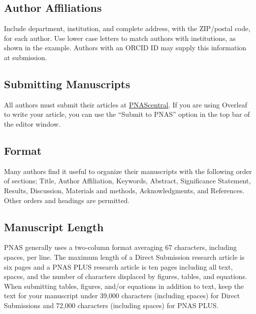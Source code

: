 \documentclass[9pt,twocolumn,twoside,]{pnas-new}
\begin{document}
\hypertarget{author-affiliations}{%
\subsection*{Author Affiliations}\label{author-affiliations}}

Include department, institution, and complete address, with the
ZIP/postal code, for each author. Use lower case letters to match
authors with institutions, as shown in the example. Authors with an
ORCID ID may supply this information at submission.

\hypertarget{submitting-manuscripts}{%
\subsection*{Submitting Manuscripts}\label{submitting-manuscripts}}

All authors must submit their articles at
\href{http://www.pnascentral.org/cgi-bin/main.plex}{PNAScentral}. If you
are using Overleaf to write your article, you can use the ``Submit to
PNAS'' option in the top bar of the editor window.

\hypertarget{format}{%
\subsection*{Format}\label{format}}

Many authors find it useful to organize their manuscripts with the
following order of sections; Title, Author Affiliation, Keywords,
Abstract, Significance Statement, Results, Discussion, Materials and
methods, Acknowledgments, and References. Other orders and headings are
permitted.

\hypertarget{manuscript-length}{%
\subsection*{Manuscript Length}\label{manuscript-length}}

PNAS generally uses a two-column format averaging 67 characters,
including spaces, per line. The maximum length of a Direct Submission
research article is six pages and a PNAS PLUS research article is ten
pages including all text, spaces, and the number of characters displaced
by figures, tables, and equations. When submitting tables, figures,
and/or equations in addition to text, keep the text for your manuscript
under 39,000 characters (including spaces) for Direct Submissions and
72,000 characters (including spaces) for PNAS PLUS.
\end{document}
